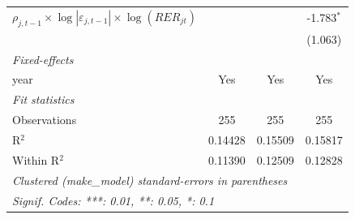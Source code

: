\begin{table}[htbp]
\begin{tabular}{lccc}
      $\rho_{j,t-1}\times\log|\varepsilon_{j,t-1}|\times\log(RER_{jt})$       &               &               & -1.783$^{*}$\\
                                                                              &               &               & (1.063)\\
      \midrule
      \emph{Fixed-effects}\\
      year                                                                    & Yes           & Yes           & Yes\\
      \midrule
      \emph{Fit statistics}\\
      Observations                                                            & 255           & 255           & 255\\
      R$^2$                                                                   & 0.14428       & 0.15509       & 0.15817\\
      Within R$^2$                                                            & 0.11390       & 0.12509       & 0.12828\\
      \midrule \midrule
      \multicolumn{4}{l}{\emph{Clustered (make\_model) standard-errors in parentheses}}\\
      \multicolumn{4}{l}{\emph{Signif. Codes: ***: 0.01, **: 0.05, *: 0.1}}\\
   \end{tabular}
\end{table}


